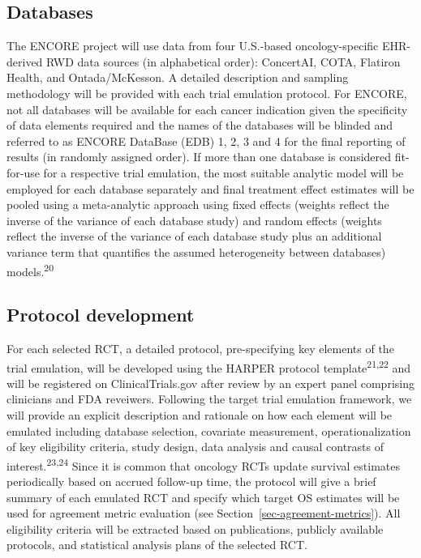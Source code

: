 \documentclass[
  letterpaper,
  DIV=11,
  numbers=noendperiod]{scrartcl}
\begin{document}
\subsection{Databases}\label{databases}

The ENCORE project will use data from four U.S.-based oncology-specific
EHR-derived RWD data sources (in alphabetical order): ConcertAI, COTA,
Flatiron Health, and Ontada/McKesson. A detailed description and
sampling methodology will be provided with each trial emulation
protocol. For ENCORE, not all databases will be available for each
cancer indication given the specificity of data elements required and
the names of the databases will be blinded and referred to as ENCORE
DataBase (EDB) 1, 2, 3 and 4 for the final reporting of results (in
randomly assigned order). If more than one database is considered
fit-for-use for a respective trial emulation, the most suitable analytic
model will be employed for each database separately and final treatment
effect estimates will be pooled using a meta-analytic approach using
fixed effects (weights reflect the inverse of the variance of each
database study) and random effects (weights reflect the inverse of the
variance of each database study plus an additional variance term that
quantifies the assumed heterogeneity between databases)
models.\textsuperscript{20}

\subsection{Protocol development}\label{protocol-development}

For each selected RCT, a detailed protocol, pre-specifying key elements
of the trial emulation, will be developed using the HARPER protocol
template\textsuperscript{21,22} and will be registered on
ClinicalTrials.gov after review by an expert panel comprising clinicians
and FDA reveiwers. Following the target trial emulation framework, we
will provide an explicit description and rationale on how each element
will be emulated including database selection, covariate measurement,
operationalization of key eligibility criteria, study design, data
analysis and causal contrasts of interest.\textsuperscript{23,24} Since
it is common that oncology RCTs update survival estimates periodically
based on accrued follow-up time, the protocol will give a brief summary
of each emulated RCT and specify which target OS estimates will be used
for agreement metric evaluation (see
Section~\ref{sec-agreement-metrics}). All eligibility criteria will be
extracted based on publications, publicly available protocols, and
statistical analysis plans of the selected RCT.
\end{document}
